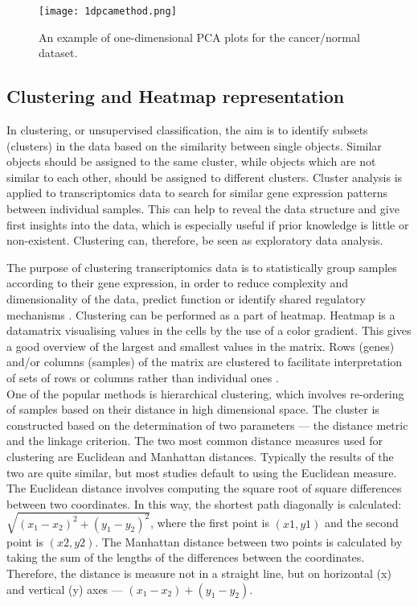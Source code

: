     
            \begin{figure}[h]
            \centering
            \texttt{[image: 1dpcamethod.png]}
            \caption{An example of one-dimensional PCA plots for the cancer/normal dataset. }
            \label{fig:1dpcamethod}
            \end{figure}
   
  
    \subsection{Clustering and Heatmap representation}
    
    
    In clustering, or unsupervised classification, the aim is to identify subsets (clusters) in the data based on the similarity between single objects. Similar objects should be assigned to the same cluster, while objects which are not similar to each other, should be assigned to different clusters.
    Cluster analysis is applied to transcriptomics data to search for similar gene expression patterns between individual samples. This can help to reveal the data structure and give first insights into the data, which is especially useful if prior knowledge is little or non-existent. Clustering can, therefore, be seen as exploratory data analysis. 
        
    The purpose of clustering transcriptomics data is to statistically group samples according to their gene expression, in order to reduce complexity and dimensionality of the data, predict function or identify shared regulatory mechanisms \cite{Metsalu2015ClustVis:Heatmap}. Clustering can be performed as a part of heatmap. Heatmap is a datamatrix visualising values in the cells by the use of a color gradient. This gives a good overview of the largest and smallest values in the matrix. Rows (genes) and/or columns (samples) of the matrix are clustered to facilitate interpretation of sets of rows or columns rather than individual ones \cite{Metsalu2015ClustVis:Heatmap}.\\

    One of the popular methods is hierarchical clustering, which involves re-ordering of samples based on their distance in high dimensional space. The cluster is constructed based on the determination of two parameters — the distance metric and the linkage criterion.
    The two most common distance measures used for clustering are Euclidean and Manhattan distances. Typically the results of the two are quite similar, but most studies default to using the Euclidean measure. 
    The Euclidean distance involves computing the square root of square differences between two coordinates. In this way, the shortest path diagonally is calculated: $ \sqrt{(x_{1}-x_{2})^{2}+(y_{1}-y_{2})^{2}}$, where the first point is $(x1, y1)$ and the second point is $(x2, y2).$
    The Manhattan distance between two points is calculated by taking the sum of the lengths of the differences between the coordinates. Therefore, the distance is measure not in a straight line, but on horizontal (x) and vertical (y) axes — $ (x_{1}-x_{2})+(y_{1}-y_{2}).$
    
